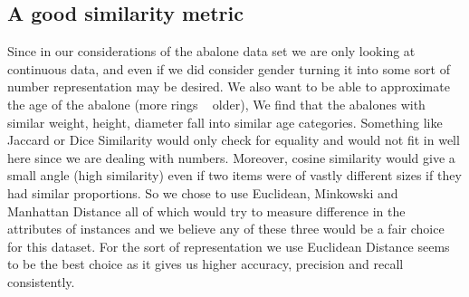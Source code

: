 \subsection{A good similarity metric}

Since in our considerations of the abalone data set we are only looking at continuous data, and even if we did consider gender turning it into some sort of number representation may be desired. We also want to be able to approximate the age of the abalone (more rings ~ older), We find that the abalones with similar weight, height, diameter fall into similar age categories. Something like Jaccard or Dice Similarity would only check for equality and would not fit in well here since we are dealing with numbers. Moreover, cosine similarity would give a small angle (high similarity) even if two items were of vastly different sizes if they had similar proportions. So we chose to use Euclidean, Minkowski and Manhattan Distance all of which would try to measure difference in the attributes of instances and we believe any of these three would be a fair choice for this dataset. For the sort of representation we use Euclidean Distance seems to be the best choice as it gives us higher accuracy, precision and recall consistently. 



